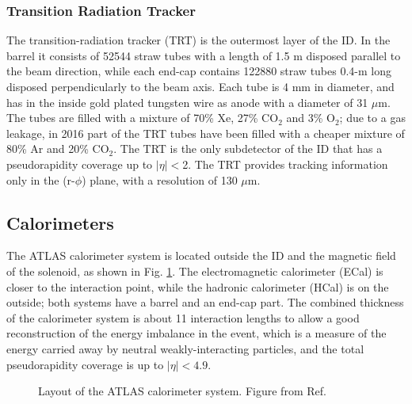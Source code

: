 \subsubsection*{Transition Radiation Tracker}

The transition-radiation tracker (TRT) is the outermost layer of the ID. In the barrel it consists of 52544 straw tubes with a length of 1.5 m disposed parallel to the beam direction, while each end-cap contains 122880 straw tubes 0.4-m long disposed perpendicularly to the beam axis. Each tube is 4 mm in diameter, and has in the inside gold plated tungsten wire as anode with a diameter of 31 $\mu$m. The tubes are filled with a mixture of 70\% Xe, 27\% CO$_2$ and 3\% O$_2$; due to a gas leakage, in 2016 part of the TRT tubes have been filled with a cheaper mixture of 80\% Ar and 20\% CO$_2$. The TRT is the only subdetector of the ID that has a pseudorapidity coverage up to $|\eta|<$2. The TRT provides tracking information only in the (r-$\phi$) plane, with a resolution of 130 $\mu$m.


\subsection{Calorimeters}
\label{sec:atlas:calo}

The ATLAS calorimeter system is located outside the ID and the magnetic field of the solenoid, as shown in Fig. \ref{fig:atlas:calo}. The electromagnetic calorimeter (ECal) is closer to the interaction point, while the hadronic calorimeter (HCal) is on the outside; both systems have a barrel and an end-cap part. 
The combined thickness of the calorimeter system is about 11 interaction lengths to allow a good reconstruction of the energy imbalance in the event, which is a measure of the energy carried away by neutral weakly-interacting particles, and the total pseudorapidity coverage is up to $|\eta|<4.9$. 

\begin{figure}[ht]
\centering
{}
\caption{Layout of the ATLAS calorimeter system. Figure from Ref. \cite{atlas:atlas}}
\label{fig:atlas:calo}
\end{figure}

